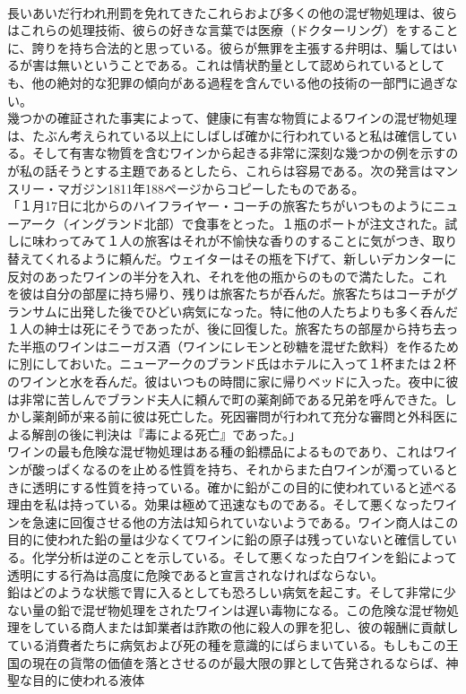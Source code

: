 \documentclass[8pt]{extreport}
\begin{document}
\begin{CJK}{UTF8}{min}
\\	長いあいだ行われ刑罰を免れてきたこれらおよび多くの他の混ぜ物処理は、彼らはこれらの処理技術、彼らの好きな言葉では医療（ドクターリング）をすることに、誇りを持ち合法的と思っている。彼らが無罪を主張する弁明は、騙してはいるが害は無いということである。これは情状酌量として認められているとしても、他の絶対的な犯罪の傾向がある過程を含んでいる他の技術の一部門に過ぎない。
\\	幾つかの確証された事実によって、健康に有害な物質によるワインの混ぜ物処理は、たぶん考えられている以上にしばしば確かに行われていると私は確信している。そして有害な物質を含むワインから起きる非常に深刻な幾つかの例を示すのが私の話そうとする主題であるとしたら、これらは容易である。次の発言はマンスリー・マガジン1811年188ページからコピーしたものである。
\\	「１月17日に北からのハイフライヤー・コーチの旅客たちがいつものようにニューアーク（イングランド北部）で食事をとった。１瓶のポートが注文された。試しに味わってみて１人の旅客はそれが不愉快な香りのすることに気がつき、取り替えてくれるように頼んだ。ウェイターはその瓶を下げて、新しいデカンターに反対のあったワインの半分を入れ、それを他の瓶からのもので満たした。これを彼は自分の部屋に持ち帰り、残りは旅客たちが呑んだ。旅客たちはコーチがグランサムに出発した後でひどい病気になった。特に他の人たちよりも多く呑んだ１人の紳士は死にそうであったが、後に回復した。旅客たちの部屋から持ち去った半瓶のワインはニーガス酒（ワインにレモンと砂糖を混ぜた飲料）を作るために別にしておいた。ニューアークのブランド氏はホテルに入って１杯または２杯のワインと水を呑んだ。彼はいつもの時間に家に帰りベッドに入った。夜中に彼は非常に苦しんでブランド夫人に頼んで町の薬剤師である兄弟を呼んできた。しかし薬剤師が来る前に彼は死亡した。死因審問が行われて充分な審問と外科医による解剖の後に判決は『毒による死亡』であった。」
\\	ワインの最も危険な混ぜ物処理はある種の鉛標品によるものであり、これはワインが酸っぱくなるのを止める性質を持ち、それからまた白ワインが濁っているときに透明にする性質を持っている。確かに鉛がこの目的に使われていると述べる理由を私は持っている。効果は極めて迅速なものである。そして悪くなったワインを急速に回復させる他の方法は知られていないようである。ワイン商人はこの目的に使われた鉛の量は少なくてワインに鉛の原子は残っていないと確信している。化学分析は逆のことを示している。そして悪くなった白ワインを鉛によって透明にする行為は高度に危険であると宣言されなければならない。
\\	鉛はどのような状態で胃に入るとしても恐ろしい病気を起こす。そして非常に少ない量の鉛で混ぜ物処理をされたワインは遅い毒物になる。この危険な混ぜ物処理をしている商人または卸業者は詐欺の他に殺人の罪を犯し、彼の報酬に貢献している消費者たちに病気および死の種を意識的にばらまいている。もしもこの王国の現在の貨幣の価値を落とさせるのが最大限の罪として告発されるならば、神聖な目的に使われる液体

\end{CJK}
\end{document}
